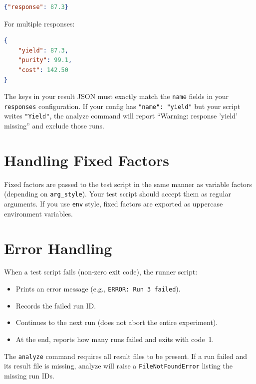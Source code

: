 \documentclass[11pt]{book}
\begin{document}
\begin{lstlisting}[language=json]
{"response": 87.3}
\end{lstlisting}

For multiple responses:

\begin{lstlisting}[language=json]
{
    "yield": 87.3,
    "purity": 99.1,
    "cost": 142.50
}
\end{lstlisting}

\begin{warning}
The keys in your result JSON must exactly match the \texttt{name} fields in your \texttt{responses} configuration. If your config has \texttt{"name": "yield"} but your script writes \texttt{"Yield"}, the analyze command will report ``Warning: response 'yield' missing'' and exclude those runs.
\end{warning}

\section{Handling Fixed Factors}

Fixed factors are passed to the test script in the same manner as variable factors (depending on \texttt{arg\_style}). Your test script should accept them as regular arguments. If you use \texttt{env} style, fixed factors are exported as uppercase environment variables.

\section{Error Handling}

When a test script fails (non-zero exit code), the runner script:
\begin{itemize}
  \item Prints an error message (e.g., \texttt{ERROR: Run 3 failed}).
  \item Records the failed run ID.
  \item Continues to the next run (does not abort the entire experiment).
  \item At the end, reports how many runs failed and exits with code~1.
\end{itemize}

The \texttt{analyze} command requires all result files to be present. If a run failed and its result file is missing, analyze will raise a \texttt{FileNotFoundError} listing the missing run IDs.
\end{document}
